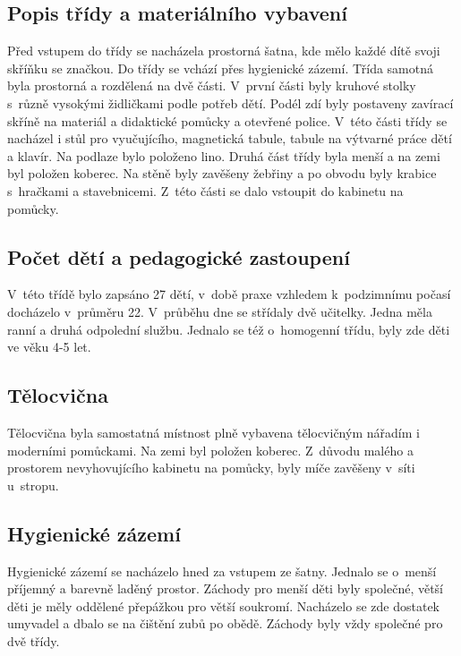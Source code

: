 
		\subsection{Popis třídy a materiálního vybavení}

			Před vstupem do třídy se nacházela prostorná šatna, kde mělo každé dítě svoji skříňku se značkou. Do třídy se vchází přes hygienické zázemí. Třída samotná byla prostorná a rozdělená na dvě části. V~první části byly kruhové stolky s~různě vysokými židličkami podle potřeb dětí. Podél zdí byly postaveny zavírací skříně na materiál a didaktické pomůcky a otevřené police. V~této části třídy se nacházel i stůl pro vyučujícího, magnetická tabule, tabule na výtvarné práce dětí a klavír. Na podlaze bylo položeno lino. Druhá část třídy byla menší a na zemi byl položen koberec. Na stěně byly zavěšeny žebřiny a po obvodu byly krabice s~hračkami a stavebnicemi. Z~této části se dalo vstoupit do kabinetu na pomůcky.

		\subsection{Počet dětí a pedagogické zastoupení}

			V~této třídě bylo zapsáno 27 dětí, v~době praxe vzhledem k~podzimnímu počasí docházelo v~průměru 22. V~průběhu dne se střídaly dvě učitelky. Jedna měla ranní a druhá odpolední službu.
			Jednalo se též o~homogenní třídu, byly zde děti ve věku 4-5 let.
		
		\subsection{Tělocvična}
			Tělocvična byla samostatná místnost plně vybavena tělocvičným nářadím i moderními pomůckami. Na zemi byl položen koberec. Z~důvodu malého a prostorem nevyhovujícího kabinetu na pomůcky,  byly míče zavěšeny v~síti u~stropu.

		\subsection{Hygienické zázemí}
			Hygienické zázemí se nacházelo hned za vstupem ze šatny. Jednalo se o~menší příjemný a barevně laděný prostor. Záchody pro menší děti byly společné, větší děti je měly oddělené přepážkou pro větší soukromí. Nacházelo se zde dostatek umyvadel a dbalo se na čištění zubů po obědě. Záchody byly vždy společné pro dvě třídy. 

